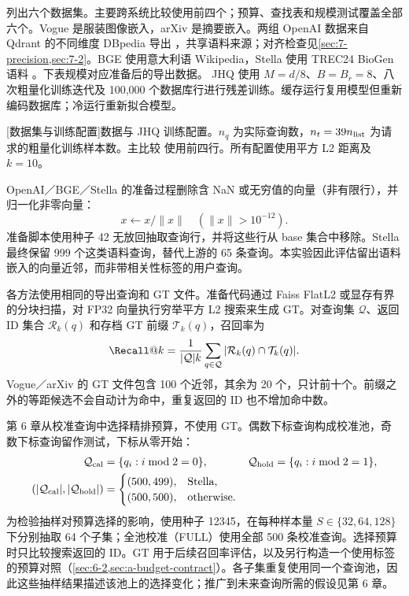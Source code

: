  列出六个数据集。主要跨系统比较使用前四个；预算、查找表和规模测试覆盖全部六个。Vogue 是服装图像嵌入，arXiv 是摘要嵌入。两组 OpenAI 数据来自 Qdrant 的不同维度 DBpedia 导出 \cite{data_vogue,data_arxiv,data_openai1536,data_openai3072}，共享语料来源；对齐检查见\cref{sec:7-precision,sec:7-2}。BGE 使用意大利语 Wikipedia，Stella 使用 TREC24 BioGen 语料 \cite{data_bge,data_stella}。下表规模对应准备后的导出数据。 JHQ 使用 $M=d/8$、$B=B_r=8$、八次粗量化训练迭代及 100,000 个数据库行进行残差训练。缓存运行复用模型但重新编码数据库；冷运行重新拟合模型。

\par\medskip\noindent\begin{minipage}{\linewidth}
\centering\captionsetup{hypcap=false}
[数据集与训练配置]{数据与 JHQ 训练配置。$n_q$ 为实际查询数，$n_t=39n_{\rm list}$ 为请求的粗量化训练样本数。主比较 使用前四行。所有配置使用平方 L2 距离及 $k=10$。}
\label{tab:3-data}
\small\setlength{\tabcolsep}{4pt}

\end{minipage}\par\medskip

OpenAI／BGE／Stella 的准备过程删除含 NaN 或无穷值的向量（非有限行），并归一化非零向量：
\[
 x\leftarrow x/\|x\|\quad(\|x\|>10^{-12}).
\]
准备脚本使用种子 42 无放回抽取查询行，并将这些行从 base 集合中移除。Stella 最终保留 999 个这类语料查询，替代上游的 65 条查询。本实验因此评估留出语料嵌入的向量近邻，而非带相关性标签的用户查询。

各方法使用相同的导出查询和 GT 文件。准备代码通过 Faiss FlatL2 或显存有界的分块扫描，对 FP32 向量执行穷举平方 L2 搜索来生成 GT。对查询集 $\mathcal Q$、返回 ID 集合 $\mathcal R_k(q)$ 和存档 GT 前缀 $\mathcal T_k(q)$，召回率为
\begin{equation}
\Recall@k=\frac{1}{|\mathcal Q|k}
\sum_{q\in\mathcal Q}|\mathcal R_k(q)\cap\mathcal T_k(q)|.
\label{eq:3-recall}
\end{equation}
Vogue／arXiv 的 GT 文件包含 100 个近邻，其余为 20 个，只计前十个。前缀之外的等距候选不会自动计为命中，重复返回的 ID 也不增加命中数。

第 6 章从校准查询中选择精排预算，不使用 GT。偶数下标查询构成校准池，奇数下标查询留作测试，下标从零开始：
\[
 \begin{aligned}
 \mathcal Q_{\rm cal}&=\{q_i:i\bmod2=0\},&
 \mathcal Q_{\rm hold}&=\{q_i:i\bmod2=1\},\\
 (|\mathcal Q_{\rm cal}|,|\mathcal Q_{\rm hold}|)
 &=\begin{cases}(500,499),&\text{Stella},\\(500,500),&\text{otherwise}.\end{cases}
 \end{aligned}
 \]
为检验抽样对预算选择的影响，使用种子 12345，在每种样本量 $S\in\{32,64,128\}$ 下分别抽取 64 个子集；全池校准（FULL）使用全部 500 条校准查询。选择预算时只比较搜索返回的 ID。GT 用于后续召回率评估，以及另行构造一个使用标签的预算对照（\cref{sec:6-2,sec:a-budget-contract}）。各子集重复使用同一个查询池，因此这些抽样结果描述该池上的选择变化；推广到未来查询所需的假设见第 6 章。
